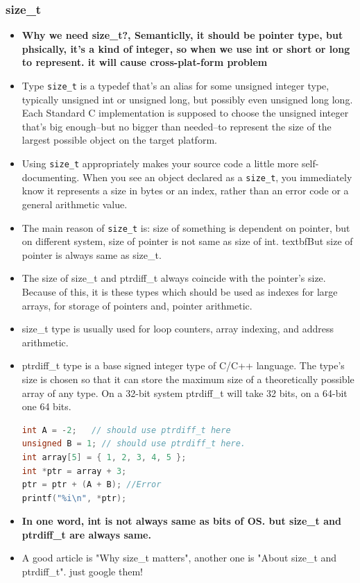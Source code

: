 \documentclass[a4paper,12pt,twoside]{book}
\begin{document}
\subsubsection{size\_t}
\begin{itemize}
	\item \textbf{Why we need size\_t?, Semanticlly, it should be pointer type, but phsically, it's a kind of integer, so when we use int or short or long to represent. it will cause cross-plat-form problem}
		
	\item Type \texttt{size\_t} is a typedef that's an alias for some unsigned integer type, typically unsigned int or unsigned long, but possibly even unsigned long long. Each Standard C implementation is supposed to choose the unsigned integer that's big enough--but no bigger than needed--to represent the size of the largest possible object on the target platform.
	
	\item Using \texttt{size\_t} appropriately makes your source code a little more self-documenting. When you see an object declared as a \texttt{size\_t}, you immediately know it represents a size in bytes or an index, rather than an error code or a general arithmetic value.
	
	\item The main reason of \texttt{size\_t} is: size of something is dependent on pointer, but on different system, size of pointer is not same as size of int.  textbf{But size of pointer is always same as size\_t}.
	
	\item The size of size\_t and ptrdiff\_t always coincide with the pointer's size. Because of this, it is these types which should be used as indexes for large arrays, for storage of pointers and, pointer arithmetic.
	
	\item size\_t type is usually used for loop counters, array indexing, and address arithmetic.
	
	\item ptrdiff\_t type is a base signed integer type of C/C++ language. The type's size is chosen so that it can store the maximum size of a theoretically possible array of any type. On a 32-bit system ptrdiff\_t will take 32 bits, on a 64-bit one 64 bits.
\begin{lstlisting}[frame=single, language=c++]
int A = -2;   // should use ptrdiff_t here
unsigned B = 1; // should use ptrdiff_t here.
int array[5] = { 1, 2, 3, 4, 5 };
int *ptr = array + 3;
ptr = ptr + (A + B); //Error
printf("%i\n", *ptr);
\end{lstlisting}
	
	\item \textbf{In one word, int is not always same as bits of OS. but size\_t and ptrdiff\_t are always same.}
	
	\item A good article is "Why size\_t matters", another one is "About size\_t and ptrdiff\_t". just google them!   
\end{itemize}
\end{document}
